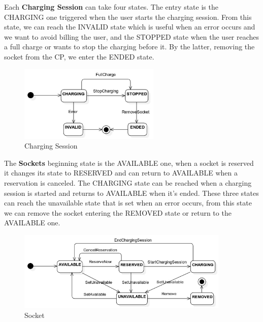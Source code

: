 \documentclass{Configuration_Files/PoliMi3i_thesis}
\begin{document}
Each \textbf{Charging Session} can take four states. The entry state is the CHARGING one triggered when the user starts the charging session. From this state, we can reach the INVALID state which is useful when an error occurs and we want to avoid billing the user, and the STOPPED state when the user reaches a full charge or wants to stop the charging before it. By the latter, removing the socket from the CP, we enter the ENDED state.
\begin{figure}[H]
    \centering
    \includegraphics[width=0.6\textwidth]{Images/StateDiagrams/Charging Session.jpg}
    \caption{Charging Session}
\end{figure}

The \textbf{Sockets} beginning state is the AVAILABLE one, when a socket is reserved it changes its state to RESERVED and can return to AVAILABLE when a reservation is canceled. The CHARGING state can be reached when a charging session is started and returns to AVAILABLE when it's ended.
These three states can reach the unavailable state that is set when an error occurs, from this state we can remove the socket entering the REMOVED state or return to the AVAILABLE one.
\begin{figure}[H]
    \centering
    \includegraphics[width=0.9\textwidth]{Images/StateDiagrams/Socket.jpg}
    \caption{Socket}
\end{figure}
\end{document}
